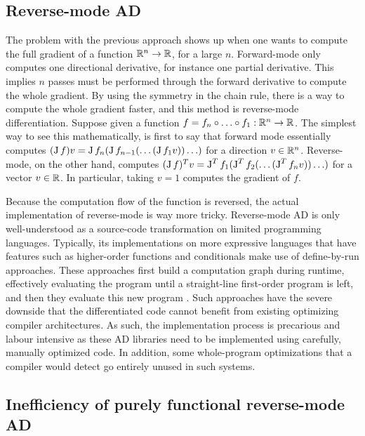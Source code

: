 
\subsection{Reverse-mode AD}

The problem with the previous approach shows up when one wants to compute the full gradient of a function $\mathbb{R}^n\to\mathbb{R}$, for a large $n$. 
Forward-mode only computes one directional derivative, for instance one partial derivative. 
This implies $n$ passes must be performed through the forward derivative to compute the whole gradient.
By using the symmetry in the chain rule, there is a way to compute the whole gradient faster, and this method is reverse-mode differentiation.
Suppose given a function $f=f_n\circ\ldots\circ f_1 :\mathbb{R}^n\to\mathbb{R}$. 
The simplest way to see this mathematically, is first to say that forward mode essentially computes $(\operatorname{J} f)v=\operatorname{J} f_n(\operatorname{J} f_{n-1}(\ldots(\operatorname{J} f_1v))\ldots)$ for a direction $v\in\mathbb{R}^n$. 
Reverse-mode, on the other hand, computes $(\operatorname{J} f)^Tv = \operatorname{J}^Tf_1(\operatorname{J}^T f_{2}(\ldots(\operatorname{J}^T f_nv))\ldots)$ for a vector $v\in\mathbb{R}$.
In particular, taking $v=1$ computes the gradient of $f$.

Because the computation flow of the function is reversed, the actual implementation of reverse-mode is way more tricky. 
Reverse-mode AD is only well-understood as a source-code transformation on limited programming languages. 
Typically, its implementations on more expressive languages that have features such as higher-order functions and conditionals
make use of define-by-run approaches. These approaches first build a computation graph during runtime, effectively evaluating the program until a straight-line
first-order program is left, and then they evaluate this new program \cite{carpenter2015stan,paszke2017automatic}. 
Such approaches have the severe downside that the differentiated code cannot benefit from existing optimizing compiler architectures. 
As such, the implementation process is precarious and labour intensive as these AD libraries need to be implemented using carefully, manually optimized code.
In addition, some whole-program optimizations that a compiler would detect go entirely unused in such systems.

\subsection{Inefficiency of purely functional reverse-mode AD}

